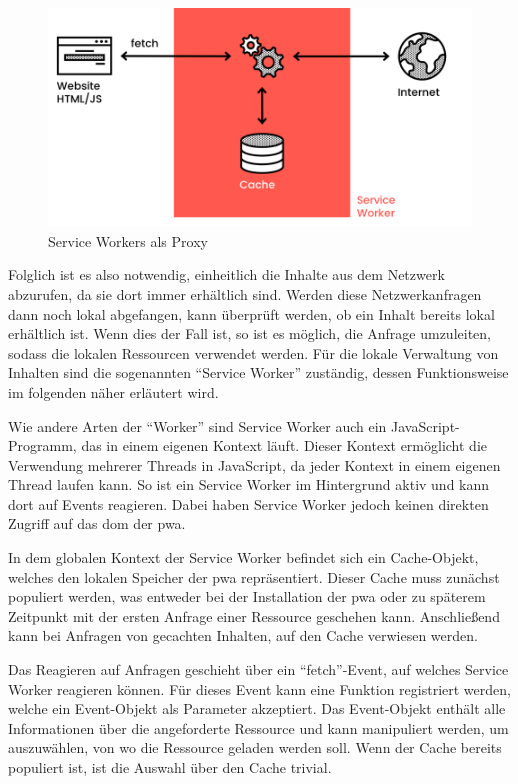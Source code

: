 \documentclass[12pt, parskip=half]{scrartcl}       %
\begin{document}
\begin{figure}
  \centering
  \includegraphics[width=1\linewidth]{src/ServiceWorker-Heise.png}
  \caption{Service Workers als Proxy\cite{src_serviceworker_heise}}
  \label{fig:heise_serviceworker}
\end{figure}

Folglich ist es also notwendig, einheitlich die Inhalte aus dem Netzwerk abzurufen, da sie dort immer erhältlich sind.
Werden diese Netzwerkanfragen dann noch lokal abgefangen, kann überprüft werden, ob ein Inhalt bereits lokal erhältlich ist.
Wenn dies der Fall ist, so ist es möglich, die Anfrage umzuleiten, sodass die lokalen Ressourcen verwendet werden.
Für die lokale Verwaltung von Inhalten sind die sogenannten \enquote{Service Worker} zuständig, dessen Funktionsweise im folgenden näher erläutert wird.

Wie andere Arten der \enquote{Worker} sind Service Worker auch ein JavaScript-Programm, das in einem eigenen Kontext läuft.
Dieser Kontext ermöglicht die Verwendung mehrerer Threads in JavaScript, da jeder Kontext in einem eigenen Thread laufen kann.
So ist ein Service Worker im Hintergrund aktiv und kann dort auf Events reagieren.
Dabei haben Service Worker jedoch keinen direkten Zugriff auf das \ac{dom} der \ac{pwa}.

In dem globalen Kontext der Service Worker befindet sich ein Cache-Objekt, welches den lokalen Speicher der \ac{pwa} repräsentiert\cite{w3c_serviceworker_nightly}.
Dieser Cache muss zunächst populiert werden, was entweder bei der Installation der \ac{pwa} oder zu späterem Zeitpunkt mit der ersten Anfrage einer Ressource geschehen kann\cite{ServiceWorker_explained}.
Anschließend kann bei Anfragen von gecachten Inhalten, auf den Cache verwiesen werden.

Das Reagieren auf Anfragen geschieht über ein \enquote{fetch}-Event, auf welches Service Worker reagieren können.
Für dieses Event kann eine Funktion registriert werden, welche ein Event-Objekt als Parameter akzeptiert.
Das Event-Objekt enthält alle Informationen über die angeforderte Ressource und kann manipuliert werden, um auszuwählen, von wo die Ressource geladen werden soll.
Wenn der Cache bereits populiert ist, ist die Auswahl über den Cache trivial.
\end{document}
